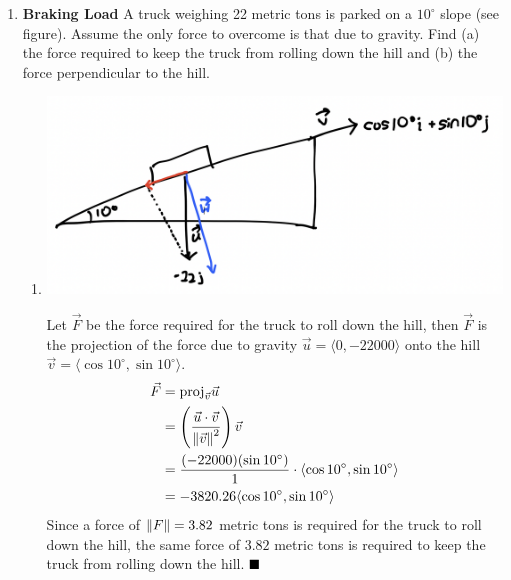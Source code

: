\begin{enumerate}
          \newpage
    \item \textbf{Braking Load} A truck weighing 22 metric tons is parked on a $10^{\circ}$ slope (see figure). Assume the only force to overcome is that due to gravity. Find (a) the force required to keep the truck from rolling down the hill and (b) the force perpendicular to the hill.
          \sol{}
          \begin{enumerate}[label=(\alph*)]
              \item \begin{center}
                        \includegraphics[scale=0.4,valign=t]{assets/larson11.3q57.png}
                    \end{center}
                    Let $\vec{F}$ be the force required for the truck to roll down the hill, then $\vec{F}$ is the projection of the force due to gravity $\vec{u} = \langle 0, -22000 \rangle$ onto the hill $\vec{v} = \langle \cos 10^{\circ}, \sin 10^{\circ} \rangle$.
                    \begin{align*}
                        \vec{F} & = \text{proj}_{\vec{v}}\vec{u}                                                              \\
                                & = \left(\frac{\vec{u} \cdot \vec{v}}{\left\lVert\vec{v}\right\rVert^2}\right)\vec{v}                        \\
                                & = \frac{(-22000)(\sin 10^{\circ})}{1}\cdot \langle \cos 10^{\circ}, \sin 10^{\circ} \rangle \\
                                & = -3820.26\langle \cos 10^{\circ}, \sin 10^{\circ} \rangle
                    \end{align*}
                    Since a force of $\left\lVert F\right\rVert = 3.82$ metric tons is required for the truck to roll down the hill, the same force of $3.82$ metric tons is required to keep the truck from rolling down the hill. $\hfill\blacksquare$


\end{enumerate}
\end{enumerate}
